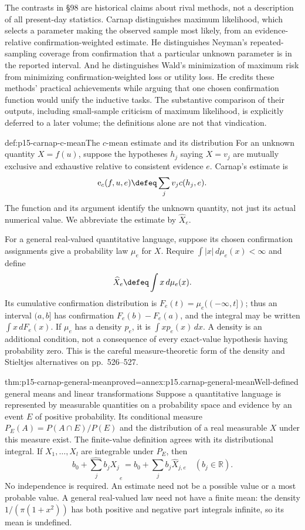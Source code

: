 The contrasts in §98 are historical claims about rival methods, not
a description of all present-day statistics. Carnap distinguishes
maximum likelihood, which selects a parameter making the observed
sample most likely, from an evidence-relative confirmation-weighted
estimate. He distinguishes Neyman's repeated-sampling coverage from
confirmation that a particular unknown parameter is in the reported
interval. And he distinguishes Wald's minimization of maximum risk
from minimizing confirmation-weighted loss or utility loss. He credits
these methods' practical achievements while arguing that one chosen
confirmation function would unify the inductive tasks. The substantive
comparison of their outputs, including small-sample criticism of maximum
likelihood, is explicitly deferred to a later volume; the definitions
alone are not that vindication.

\begin{hbdefinition}{def:p15-carnap-c-mean}{The \(c\)-mean estimate and its distribution}
For an unknown quantity \(X=f(u)\), suppose the hypotheses
\(h_j\) saying \(X=v_j\) are mutually exclusive and exhaustive
relative to consistent evidence \(e\). Carnap's estimate is
\[
 \operatorname e_c(f,u,e)\defeq\sum_j v_jc(h_j,e).
\]
The function and its argument identify the unknown quantity, not just
its actual numerical value. We abbreviate the estimate by
\(\widehat X_e\).

For a general real-valued quantitative language, suppose its chosen
confirmation assignments give a probability law \(\mu_e\) for
\(X\). Require \(\int |x|\,d\mu_e(x)<\infty\) and define
\[
 \widehat X_e\defeq\int x\,d\mu_e(x).
\]
Its cumulative confirmation distribution is
\(F_e(t)=\mu_e(({-\infty},t])\); thus an interval \((a,b]\)
has confirmation \(F_e(b)-F_e(a)\), and the integral may be written
\(\int x\,dF_e(x)\). If \(\mu_e\) has a density \(p_e\),
it is \(\int xp_e(x)\,dx\). A density is an additional condition,
not a consequence of every exact-value hypothesis having probability
zero. This is the careful measure-theoretic form of the density and
Stieltjes alternatives on pp.~526--527.
\end{hbdefinition}

\begin{hbtheorem}{thm:p15-carnap-general-mean}{proved=annex:p15.carnap-general-mean}{Well-defined general means and linear transformations}
Suppose a quantitative language is represented by measurable quantities
on a probability space and evidence by an event \(E\) of positive
probability. Its conditional measure
\(P_E(A)=P(A\cap E)/P(E)\) and the distribution of a real measurable
\(X\) under this measure exist. The finite-value definition agrees
with its distributional integral. If \(X_1,\ldots,X_l\) are
integrable under \(P_E\), then
\[
 \widehat{b_0+\sum_j b_jX_j}_e=b_0+\sum_j b_j\widehat X_{j,e}
 \quad(b_j\in\mathbb R).
\]
No independence is required. An estimate need not be a possible value
or a most probable value. A general real-valued law need not have a
finite mean: the density \(1/(\pi(1+x^2))\) has both positive and
negative part integrals infinite, so its mean is undefined.
\end{hbtheorem}

